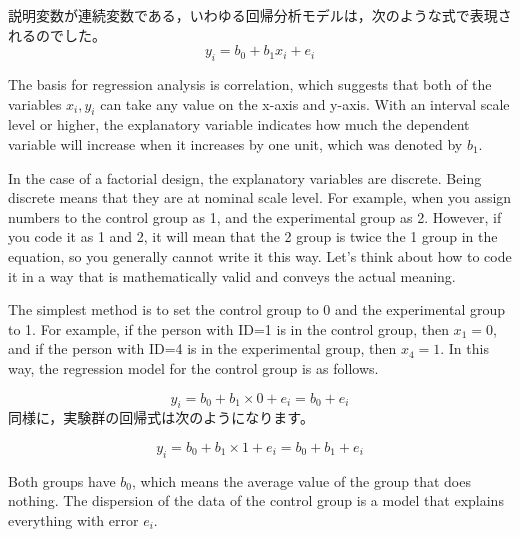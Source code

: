 \documentclass{ltjbook}
\begin{document}
説明変数が連続変数である，いわゆる回帰分析モデルは，次のような式で表現されるのでした。
\[ y_i = b_0 + b_1 x_i + e_i \]

The basis for regression analysis is correlation, which suggests that both of the variables $x_i, y_i$ can take any value on the x-axis and y-axis. With an interval scale level or higher, the explanatory variable indicates how much the dependent variable will increase when it increases by one unit, which was denoted by $b_1$.

In the case of a factorial design, the explanatory variables are discrete. Being discrete means that they are at nominal scale level.
For example, when you assign numbers to the control group as 1, and the experimental group as 2. However, if you code it as 1 and 2, it will mean that the 2 group is twice the 1 group in the equation, so you generally cannot write it this way. Let's think about how to code it in a way that is mathematically valid and conveys the actual meaning.

The simplest method is to set the control group to 0 and the experimental group to 1. For example, if the person with ID=1 is in the control group, then $x_1=0$, and if the person with ID=4 is in the experimental group, then $x_4=1$. In this way, the regression model for the control group is as follows.

\[ y_i = b_0 + b_1 \times 0 + e_i = b_0 + e_i \]
同様に，実験群の回帰式は次のようになります。

\[ y_i = b_0 + b_1 \times 1 + e_i = b_0 + b_1 + e_i \]

Both groups have $b_0$, which means the average value of the group that does nothing. The dispersion of the data of the control group is a model that explains everything with error $e_i$.
\end{document}
